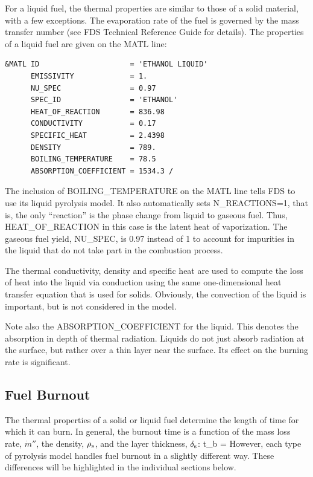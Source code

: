 \documentclass[11pt]{book}
\begin{document}
For a liquid fuel, the thermal properties are similar to those of a solid material, with a few exceptions. The evaporation rate of the fuel is governed by the mass transfer number (see FDS Technical Reference Guide for details). The properties of a liquid fuel are given on the {\ct MATL} line:
\begin{lstlisting}
&MATL ID                     = 'ETHANOL LIQUID'
      EMISSIVITY             = 1.
      NU_SPEC                = 0.97
      SPEC_ID                = 'ETHANOL'
      HEAT_OF_REACTION       = 836.98
      CONDUCTIVITY           = 0.17
      SPECIFIC_HEAT          = 2.4398
      DENSITY                = 789.
      BOILING_TEMPERATURE    = 78.5
      ABSORPTION_COEFFICIENT = 1534.3 /
\end{lstlisting}
The inclusion of {\ct BOILING\_TEMPERATURE} on the {\ct MATL} line tells FDS to use its liquid pyrolysis model. It also automatically sets {\ct N\_REACTIONS=1}, that is, the only ``reaction'' is the phase change from liquid to gaseous fuel. Thus, {\ct HEAT\_OF\_REACTION} in this case is the latent heat of vaporization. The gaseous fuel yield, {\ct NU\_SPEC}, is 0.97 instead of 1 to account for impurities in the liquid that do not take part in the combustion process.

The thermal conductivity, density and specific heat are used to compute the loss of heat into the liquid via conduction using the same one-dimensional heat transfer equation that is used for solids. Obviously, the convection of the liquid is important, but is not considered in the model.

Note also the {\ct ABSORPTION\_COEFFICIENT} for the liquid. This denotes the absorption in depth of thermal radiation. Liquids do not just absorb radiation at the surface, but rather over a thin layer near the surface. Its effect on the burning rate is significant.

\subsection{Fuel Burnout}

The thermal properties of a solid or liquid fuel determine the length of time for which it can burn. In general, the
burnout time is a function of the mass loss rate, $\dot{m}''$, the density, $\rho_{\rm s}$, and the
layer thickness, $\delta_{\rm s}$:
\be t_{\rm b} =  \ee
However, each type of pyrolysis model handles fuel burnout in a slightly different way. These differences will be
highlighted in the individual sections below.
\end{document}
